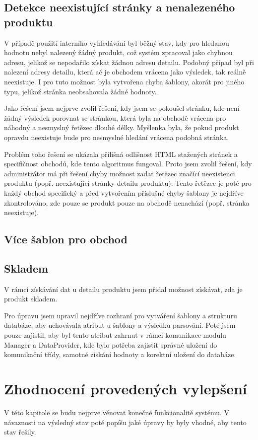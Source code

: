 \documentclass[thesis=B,czech]{FITthesis}[2012/06/26]
\begin{document}
\section{Detekce neexistující stránky a nenalezeného produktu}
V případě použití interního vyhledávání byl běžný stav, kdy pro hledanou hodnotu nebyl nalezený žádný produkt, což 
systém zpracoval jako chybnou adresu, jelikož se nepodařilo získat žádnou adresu detailu. Podobný případ byl při nalezení adresy detailu, která
ač je obchodem vrácena jako výsledek, tak reálně neexistuje. I pro tuto možnost byla vytvořena chyba šablony, akorát pro jiného typu, jelikož stránka neobsahovala žádné hodnoty.
\par
Jako řešení jsem nejprve zvolil řešení, kdy jsem se pokoušel stránku, kde není žádný výsledek porovnat se stránkou, která
byla na obchodě vrácena pro náhodný a nesmyslný řetězec dlouhé délky. Myšlenka byla, že pokud produkt opravdu neexistuje bude
pro nesmyslné hledání vrácena podobná stránka.
\par
Problém toho řešení se ukázala přílišná odlišnost HTML stažených stránek a specifičnost obchodů, kde tento algoritmus fungoval.
Proto jsem zvolil řešení, kdy administrátor má při řešení chyby možnost zadat řetězec značící neexistenci produktu (popř. neexistující stránky detailu produktu). Tento řetězec je poté pro každý obchod specifický a před vytvořením příslušné chyby šablony je nejdříve zkontrolováno, zde
pouze se produkt pouze na obchodě nenachází (popř. stránka neexistuje).

\section{Více šablon pro obchod}

\section{Skladem}
V rámci získávání dat u detailu produktu jsem přidal možnost získávat, zda je produkt skladem. 
\par
Pro úpravu jsem upravil nejdříve rozhraní pro vytváření šablony a strukturu databáze, aby uchovávala atribut u šablony a výsledku parsování.
Poté jsem pouze zajistil, aby byl tento atribut zahrnut v rámci komunikace modulu Manager a DataProvider, kde bylo potřeba zajistit
správné uložení do komunikační třídy, samotné získání hodnoty a korektní uložení do databáze.

\chapter{Zhodnocení provedených vylepšení}
V této kapitole se budu nejprve věnovat konečné funkcionalitě systému. V návaznosti na výsledný stav poté popíšu jaké úpravy by byly 
vhodné, aby tento stav řešily.
\end{document}
